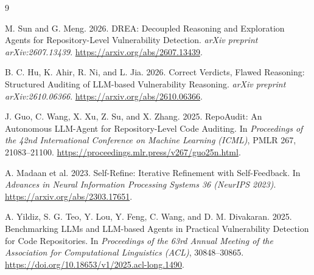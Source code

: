 \documentclass[sigconf,nonacm]{acmart}
\begin{document}
\begin{thebibliography}{9}

M. Sun and G. Meng. 2026.
\newblock DREA: Decoupled Reasoning and Exploration Agents for
Repository-Level Vulnerability Detection.
\newblock \emph{arXiv preprint arXiv:2607.13439}.
\newblock \url{https://arxiv.org/abs/2607.13439}.

B. C. Hu, K. Ahir, R. Ni, and L. Jia. 2026.
\newblock Correct Verdicts, Flawed Reasoning: Structured
Auditing of LLM-based Vulnerability Reasoning.
\newblock \emph{arXiv preprint arXiv:2610.06366}.
\newblock \url{https://arxiv.org/abs/2610.06366}.

J. Guo, C. Wang, X. Xu, Z. Su, and X. Zhang. 2025.
\newblock RepoAudit: An Autonomous LLM-Agent for
Repository-Level Code Auditing.
\newblock In \emph{Proceedings of the 42nd International
Conference on Machine Learning (ICML)}, PMLR 267,
21083--21100.
\newblock \url{https://proceedings.mlr.press/v267/guo25n.html}.

A. Madaan et al. 2023.
\newblock Self-Refine: Iterative Refinement with Self-Feedback.
\newblock In \emph{Advances in Neural Information Processing
Systems 36 (NeurIPS 2023)}.
\newblock \url{https://arxiv.org/abs/2303.17651}.

A. Yildiz, S. G. Teo, Y. Lou, Y. Feng, C. Wang,
and D. M. Divakaran. 2025.
\newblock Benchmarking LLMs and LLM-based Agents in
Practical Vulnerability Detection for Code Repositories.
\newblock In \emph{Proceedings of the 63rd Annual Meeting of
the Association for Computational Linguistics (ACL)},
30848--30865.
\newblock \url{https://doi.org/10.18653/v1/2025.acl-long.1490}.

\end{thebibliography}
\end{document}
